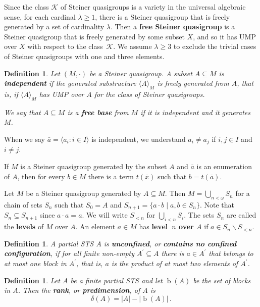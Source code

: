 \documentclass[10pt,a4paper]{article}
\DeclareMathOperator{\bl}{b}
\theoremstyle{note}
\newtheorem{df}[thm]{Definition}
\begin{document}
Since the class $\mathcal{K}$ of Steiner quasigroups is a variety in the universal algebraic sense, for each cardinal $\lambda \geq 1$, there is a Steiner quasigroup that is freely generated by a set of cardinality $\lambda$. Then a \textbf{free Steiner quasigroup} is a Steiner quasigroup that is freely generated by some subset $X$, and so it has UMP over $X$ with respect to the class~$\mathcal{K}$. We assume $\lambda \geq 3$ to exclude the trivial cases of Steiner quasigroups with one and three elements.

	\begin{df} Let $(M,\cdot)$ be a Steiner quasigroup. A subset $A\subseteq M$ is  \textbf{independent} if the generated substructure $\langle A\rangle_M$ is freely generated from $A$, that is, if $\langle A\rangle_M$ has UMP over $A$ for the class of Steiner quasigroups. 
		
		We say that $A\subseteq M$ is a \textbf{free base} from $M$  if it is independent and it generates $M$. 
	\end{df}
	When we say $\bar{a} = \langle a_i : i \in I \rangle$ is independent, we understand $a_i\neq a_j$ if  $i,j\in I$ and $i\neq j$.
	
	If $M$ is a Steiner quasigroup generated by the subset $A$ and $\bar{a}$ is an enumeration of $A$, then for every $b \in M$ there is a term $t(\bar{x})$ such that $b=t(\bar{a})$.

 Let $M$ be a Steiner quasigroup generated by $A\subseteq M$.  Then  $M=\bigcup_{n<\omega} S_n$ for a chain of sets $S_n$ such that  $S_0 =A$ and $S_{n+1}= \{a\cdot b\mid a,b\in S_n\}$. Note that $S_n\subseteq S_{n+1}$  since  $a\cdot a = a$.
 We will write $S_{<n}$ for $\bigcup_{i<n} S_i$. 
	 The sets $S_n$  are called the \textbf{levels} of $M$ over $A$. An element $a\in M$ has   \textbf{level~$n$ over $A$}  if $a\in S_n\smallsetminus S_{<n}$.

	\begin{df} A partial  STS $A$ is \textbf{unconfined}, or \textbf{contains no confined configuration}, if for all finite non-empty $A^\prime \subseteq A$ there is $a \in A^\prime$ that belongs to at most one block in $A^\prime$, that is, $a$ is the product of at most two elements of $A^\prime$.
		
	\end{df}

\begin{df} Let $A$ be a finite partial STS and let $\bl(A)$ be the set of blocks in $A$. Then the \textbf{rank}, or \textbf{predimension}, of $A$ is
	\[ \delta(A)= |A|-|\bl(A)| \, .\]
\end{df}
\end{document}
